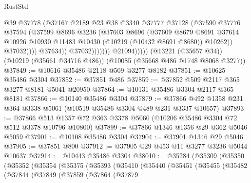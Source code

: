 \begin{lexlean}{RustStd}
\begin{coremodule}
                                  @39
                                  @37778
                                  (@37167
                                    @2189
                                    @23
                                    @38
                                    @3340
                                    @37777
                                    @37128
                                    (@37590
                                      @37776
                                      @37594
                                      (@37599
                                        @8696
                                        @3236
                                        (@37603
                                          @8696
                                          (@37609
                                            @8679
                                            @8691
                                            @37614
                                            @10926
                                            @10930
                                            @11483
                                            @10430
                                            (@10219 (@10432 @8691 @8680))
                                            @10262))
                                        @37032))))
                                @37634))
                            @37032)))))))
              @21094)))))
    (@13221 (@35657 @34))
    (@10219 (@35661 @34716 @486))
    (@10085 (@35668 @486 @1748 @8068 @3277))
@37849 := @10616 @35486 @2118 @509 @3277 @8182
@37851 := @10625 @35486 @3304
@37852 := @37851 @486
@37859 := @37852 @509 @2117 @365 @3277 @8181 @5041 @20950
@37864 := @10131 @35486 @3304 @2117 @365 @8181
@37866 := @10140 @35486 @3304
@37879 := @37866 @492 @1358 @231 @364 @3338 @5061 (@10519 @35486 @3304 @489 @231 @3337 @10657)
@37893 := @37866 @513 @1357 @72 @363 @3378 @5060 (@10206 @35486 @3304 @72 @512 @3378 @10796 @10800)
@37899 := @37866 @1346 @1356 @29 @362 @5046 @5059
@37901 := @10108 @35486 @3304
@37904 := @37901 @1346 @29 @5046
@37905 := @37851 @800
@37912 := @37905 @29 @453 @11 @3277 @3236 @5044 @10637
@37914 := @10443 @35486 @3304
@38010 := @35284
    (@35309
      (@35350
        (@35352
          (@35354
            (@35375
              (@35393
                (@35410
                  (@35440
                    (@35451
                      (@35455
                        (@35482
                          (@37844
                            (@37849
                              (@37859
                                (@37864
                                  (@37879

\end{coremodule}
\end{lexlean}
